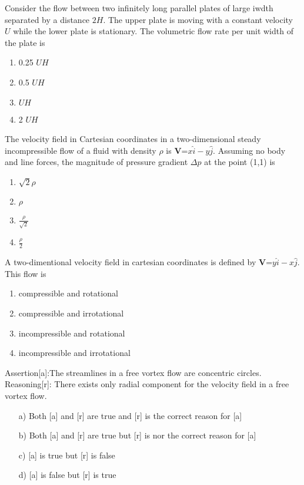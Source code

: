 \item Consider the flow between two infinitely long parallel plates of large iwdth separated by a distance $2H$. The upper plate is moving with a constant velocity $U$ while the lower plate is stationary. The volumetric flow rate per unit width of the plate is 
\begin{multicols}{2}
    \begin{enumerate}
        \item 0.25 $UH$
         \item 0.5 $UH$
          \item  $UH$
           \item 2 $UH$
    \end{enumerate}
\end{multicols}
\vspace{0.5cm}
\item The velocity field in Cartesian coordinates in a two-dimensional steady incompressible flow of a fluid with density $\rho$ is \textbf{V}=$x\hat{i}-y\hat{j}$. Assuming no body and line forces, the magnitude of pressure gradient $\Delta p$ at the point (1,1) is
\begin{multicols}{2}
    \begin{enumerate}
        \item $\sqrt{2}\rho$
        \item $\rho$
        \item $\frac{\rho}{\sqrt{2}}$
        \item $\frac{\rho}{2}$
    \end{enumerate}
\end{multicols}

\item A two-dimentional velocity field in cartesian coordinates is defined by \textbf{V}=$y\hat{i}-x\hat{j}$. This flow is 
\begin{multicols}{2}
    \begin{enumerate}
        \item compressible and rotational 
        \item compressible and irrotational 
        \item incompressible and rotational 
        \item incompressible and irrotational 
    \end{enumerate}
\end{multicols}
\item Assertion[a]:The streamlines in a free vortex flow are concentric circles.\\
Reasoning[r]: There exists only radial component for the velocity field in a free vortex flow.
\begin{enumerate}
    \item[a)] Both [a] and [r] are true and [r] is the correct reason for [a]
    \item[b)] Both [a] and [r] are true but [r] is nor the correct reason for [a]
    \item[c)]  [a] is true but [r] is false 
    \item[d)]  [a] is false but [r] is true    
\end{enumerate}

